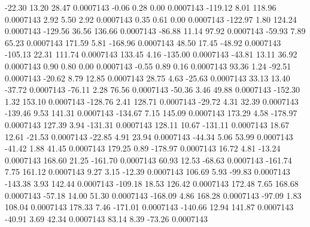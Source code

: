       -22.30       13.20       28.47     0.0007143
       -0.06        0.28        0.00     0.0007143
     -119.12        8.01      118.96     0.0007143
        2.92        5.50        2.92     0.0007143
        0.35        0.61        0.00     0.0007143
     -122.97        1.80      124.24     0.0007143
     -129.56       36.56      136.66     0.0007143
      -86.88       11.14       97.92     0.0007143
      -59.93        7.89       65.23     0.0007143
      171.59        5.81     -168.96     0.0007143
       48.50       17.45      -48.92     0.0007143
     -105.13       22.31      111.74     0.0007143
      133.45        4.16     -135.00     0.0007143
      -43.81       13.11       36.92     0.0007143
        0.90        0.80        0.00     0.0007143
       -0.55        0.89        0.16     0.0007143
       93.36        1.24      -92.51     0.0007143
      -20.62        8.79       12.85     0.0007143
       28.75        4.63      -25.63     0.0007143
       33.13       13.40      -37.72     0.0007143
      -76.11        2.28       76.56     0.0007143
      -50.36        3.46       49.88     0.0007143
     -152.30        1.32      153.10     0.0007143
     -128.76        2.41      128.71     0.0007143
      -29.72        4.31       32.39     0.0007143
     -139.46        9.53      141.31     0.0007143
     -134.67        7.15      145.09     0.0007143
      173.29        4.58     -178.97     0.0007143
      127.39        3.94     -131.31     0.0007143
      128.11       10.67     -131.11     0.0007143
       18.67       12.61      -21.53     0.0007143
      -22.85        4.91       23.94     0.0007143
      -44.34        5.06       53.99     0.0007143
      -41.42        1.88       41.45     0.0007143
      179.25        0.89     -178.97     0.0007143
       16.72        4.81      -13.24     0.0007143
      168.60       21.25     -161.70     0.0007143
       60.93       12.53      -68.63     0.0007143
     -161.74        7.75      161.12     0.0007143
        9.27        3.15      -12.39     0.0007143
      106.69        5.93      -99.83     0.0007143
     -143.38        3.93      142.44     0.0007143
     -109.18       18.53      126.42     0.0007143
      172.48        7.65      168.68     0.0007143
      -57.18       14.00       51.30     0.0007143
     -168.09        4.86      168.28     0.0007143
      -97.09        1.83      108.04     0.0007143
      178.33        7.46     -171.01     0.0007143
     -140.66       12.94      141.87     0.0007143
      -40.91        3.69       42.34     0.0007143
       83.14        8.39      -73.26     0.0007143
